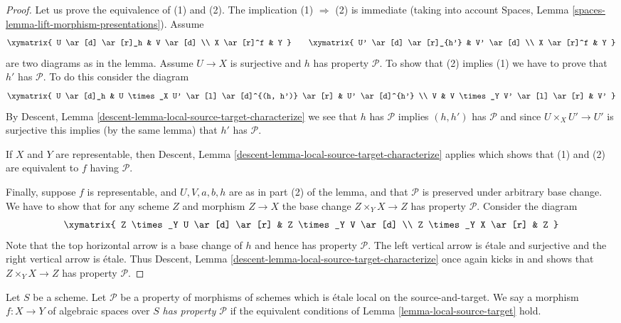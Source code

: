 \begin{proof}
Let us prove the equivalence of (1) and (2).
The implication (1) $\Rightarrow$ (2) is immediate (taking into account
Spaces, Lemma \ref{spaces-lemma-lift-morphism-presentations}).
Assume
$$
\xymatrix{
U \ar[d] \ar[r]_h & V \ar[d] \\
X \ar[r]^f & Y
}
\quad\quad
\xymatrix{
U' \ar[d] \ar[r]_{h'} & V' \ar[d] \\
X \ar[r]^f & Y
}
$$
are two diagrams as in the lemma. Assume $U \to X$ is
surjective and $h$ has property $\mathcal{P}$. To show that (2)
implies (1) we have to prove that $h'$ has $\mathcal{P}$. To do
this consider the diagram
$$
\xymatrix{
U \ar[d]_h &
U \times_X U' \ar[l] \ar[d]^{(h, h')} \ar[r] &
U' \ar[d]^{h'} \\
V &
V \times_Y V' \ar[l] \ar[r] &
V'
}
$$
By
Descent, Lemma \ref{descent-lemma-local-source-target-characterize}
we see that $h$ has $\mathcal{P}$ implies $(h, h')$ has $\mathcal{P}$
and since $U \times_X U' \to U'$ is surjective this implies (by the
same lemma) that $h'$ has $\mathcal{P}$.

\medskip\noindent
If $X$ and $Y$ are representable, then
Descent, Lemma \ref{descent-lemma-local-source-target-characterize}
applies which shows that (1) and (2) are equivalent to $f$ having
$\mathcal{P}$.

\medskip\noindent
Finally, suppose $f$ is representable, and $U, V, a, b, h$ are
as in part (2) of the lemma, and that $\mathcal{P}$ is preserved under
arbitrary base change. We have to show that for any scheme
$Z$ and morphism $Z \to X$ the base change $Z \times_Y X \to Z$
has property $\mathcal{P}$. Consider the diagram
$$
\xymatrix{
Z \times_Y U \ar[d] \ar[r] &
Z \times_Y V \ar[d] \\
Z \times_Y X \ar[r] &
Z
}
$$
Note that the top horizontal arrow is a base change of $h$ and
hence has property $\mathcal{P}$. The left vertical arrow is \'etale
and surjective and the right vertical arrow is \'etale. Thus
Descent, Lemma \ref{descent-lemma-local-source-target-characterize}
once again kicks in and shows that $Z \times_Y X \to Z$
has property $\mathcal{P}$.
\end{proof}

\begin{definition}
\label{definition-P}
Let $S$ be a scheme.
Let $\mathcal{P}$ be a property of morphisms of schemes
which is \'etale local on the source-and-target.
We say a morphism $f : X \to Y$ of algebraic spaces over $S$
{\it has property $\mathcal{P}$} if the equivalent conditions of
Lemma \ref{lemma-local-source-target}
hold.
\end{definition}

